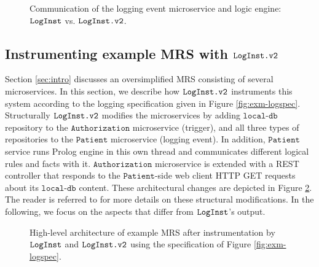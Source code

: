 \begin{figure} 
	\centering
	\caption{Communication of the logging event microservice and logic engine: $\texttt{LogInst}$ vs. $\texttt{LogInst.v2}$.}
	\label{fig:mrs-prolog-comm}
\end{figure}


\subsection{Instrumenting example MRS with $\texttt{LogInst.v2}$} \label{sec:cstudy}
Section \ref{sec:intro} discusses an oversimplified MRS consisting of several microservices. In this section, we describe how $\texttt{LogInst.v2}$ instruments this system according to the logging specification given in Figure \ref{fig:exm-logspec}. Structurally $\texttt{LogInst.v2}$ modifies the microservices by adding $\texttt{local-db}$ repository to the $\mathtt{Authorization}$ microservice (trigger), and all three types of repositories to the $\mathtt{Patient}$ microservice (logging event). In addition, $\mathtt{Patient}$ service runs Prolog engine in this own thread and communicates different logical rules and facts with it. $\mathtt{Authorization}$ microservice is extended with a REST controller that responds to the $\mathtt{Patient}$-side web client HTTP GET requests about its $\texttt{local-db}$ content. These architectural changes are depicted in Figure \ref{fig:mrs-mics-target}. The reader is referred to \cite{stpsa21} for more details on these structural modifications. In the following, we focus on the aspects that differ from $\texttt{LogInst}$'s output. 

\begin{figure} 
	\centering
	\caption{High-level architecture of example MRS after instrumentation by $\texttt{LogInst}$ and $\texttt{LogInst.v2}$ using the specification of Figure \ref{fig:exm-logspec}.}
	\label{fig:mrs-mics-target}
\end{figure}

